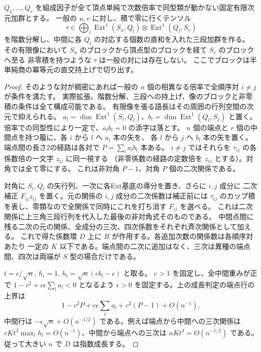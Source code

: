 \begin{lemma}\label{lem:growth-fixed-middle}
$Q_1,\ldots,Q_r$ を組成因子が全て頂点単純で次数倍率で同型類が動かない固定有限次元加群とする。
一般の $u,v$ に対し、積で零に行くテンソル
\[
 \tau\in\bigoplus_l \operatorname{Ext}^1(S_u,Q_l)\otimes\operatorname{Ext}^1(Q_l,S_v)
\]
を階数分解し、中間に各 $Q_l$ の対応する個数の直和を入れた三段加群を作る。
その有限像において $S_u$ のブロックから頂点型のブロックを経て $S_v$ のブロックへ至る
非零積を持つような $\tau$ は一般の対には存在しない。
ここでブロックは半単純商の冪等元の直交持上げで切り出す。
\end{lemma}
\begin{proof}
そのような対が稠密にあれば一般の $n$ 個の相異なる倍率で全順序対 $i\ne j$ が条件を満たす。
実際拡張、階数分解、三段への持上げ、像のブロックと非零積の条件は全て構成可能である。
有限像を張る語長はその周囲の行列空間の次元で抑えられる。
$a_l=\dim\operatorname{Ext}^1(S_i,Q_l)$、$b_l=\dim\operatorname{Ext}^1(Q_l,S_j)$
と置く。倍率での同型性により一定で、$a_l b_l=0$ の添字は落とす。
$n$ 個の端点と $r$ 個の中間点を持つ箙に、各 $i$ から $l$ へ $a_l$ 本の矢を、
各 $l$ から $j$ へ $b_l$ 本の矢を置く。端点間の長さ2の経路は各対で $P=\sum_l a_l b_l$ 本ある。
$i\ne j$ ではそれらを $\tau_{ij}$ の各係数倍の一文字 $z_{ij}$ に同一視する
（非零係数の経路の定数倍を $z_{ij}$ とする）。対角では全て零にする。
これは非対角 $P-1$、対角 $P$ 個の二次関係である。

対角に $S_i,Q_l$ の矢行列、一次に各Ext基底の導分を置き、さらに $i,j$ 成分に
二次補正 $F_{ij}z_{ij}$ を置く。元の関係の $i,j$ 成分の二次係数は補正前には
$\tau_{ij}$ のカップ積を表し、零類なので全関係で同時にこれを打ち消す $F_{ij}$ を選べる。
これは二次関係に上三角三段行列を代入した最後の非対角式そのものである。
中間点間に残る二次の元の関係、全成分の三次、四次係数をそれぞれ斉次関係として加える。
これで得た係数環 $D$ 上に $B$ が作用する。各追加次数の関係数は各順序対あたり
一定の $K$ 以下である。端点間の二次に追加はなく、三次は異種の端点間、四次は両端が $S$ 型の場合だけである。

$t=c/\sqrt n$, $h_i=1$, $h_l=\sqrt n(c b_l-\epsilon)$ と取る。
$c>1$ を固定し、全中間重みが正で $1-c^2+c\epsilon\sum_l a_l<0$ となるよう
$\epsilon>0$ を固定する。上の成長判定の端点行の上界は
\[
 1-c^2P+c\epsilon\sum_l a_l+c^2(P-1)+O(n^{-1}),
\]
中間行は $-\epsilon\sqrt n+O(n^{-1/2})$ である。例えば端点から中間への三次関係は
$rKt^3\max_l h_l=O(n^{-1})$、中間から端点への三次は $nKt^3=O(n^{-1/2})$ である。
従って大きい $n$ で $D$ は指数成長する。


\end{proof}
